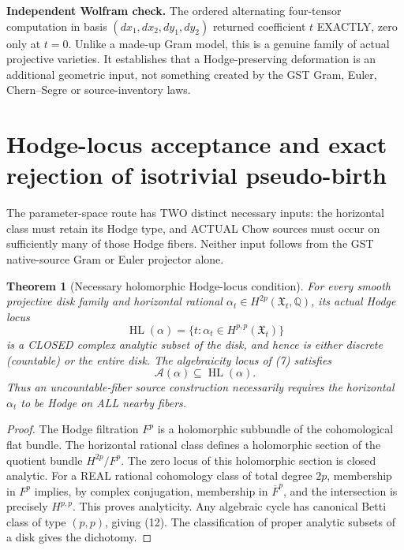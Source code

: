 \documentclass[11pt]{article}
\newcommand{\Q}{\mathbb Q}
\newtheorem{theorem}{Theorem}
\begin{document}
\noindent\textbf{Independent Wolfram check.}
The ordered alternating four-tensor computation in
basis \((dx_1,dx_2,dy_1,dy_2)\)
returned coefficient \(t\) EXACTLY,
zero only at \(t=0\).
Unlike a made-up Gram model, this is
a genuine family of actual projective varieties.
It establishes that a Hodge-preserving deformation
is an additional geometric input, not something
created by the GST Gram, Euler, Chern--Segre or
source-inventory laws.

\section{Hodge-locus acceptance and exact rejection of isotrivial pseudo-birth}
The parameter-space
route has TWO
distinct
necessary inputs:
the horizontal
class must retain
its Hodge type,
and ACTUAL
Chow sources
must occur
on sufficiently
many of those
Hodge fibers.
Neither input
follows from
the GST
native-source
Gram or Euler
projector alone.

\begin{theorem}[Necessary holomorphic Hodge-locus condition]
For every
smooth projective
disk family
and horizontal
rational
\(\alpha_t\in
H^{2p}(\mathfrak X_t,\Q)\),
its actual
Hodge locus
\[
 \operatorname{HL}(\alpha)
 =\{t:\alpha_t
        \in H^{p,p}(\mathfrak X_t)\}
\]
is a CLOSED
complex analytic
subset of
the disk,
and hence
is either
discrete
(countable)
or the
entire disk.
The algebraicity
locus of (7)
satisfies
\[
 \boxed{
 \mathscr A(\alpha)
           \subseteq\operatorname{HL}(\alpha).}
                                                               \tag{12}
\]
Thus an
uncountable-fiber
source construction
necessarily
requires
the horizontal
\(\alpha_t\)
to be Hodge
on ALL
nearby fibers.
\end{theorem}
\begin{proof}
The Hodge
filtration
\(F^p\)
is a holomorphic
subbundle
of the
cohomological
flat bundle.
The horizontal
rational class
defines a
holomorphic
section of
the quotient
bundle
\(H^{2p}/F^p\).
The zero locus
of this
holomorphic
section is
closed analytic.
For a REAL
rational
cohomology class
of total degree
\(2p\),
membership
in \(F^p\)
implies, by
complex conjugation,
membership
in \(\overline F^p\),
and the
intersection
is precisely
\(H^{p,p}\).
This proves
analyticity.
Any algebraic
cycle has
canonical
Betti class
of type
\((p,p)\),
giving (12).
The
classification
of proper
analytic
subsets of
a disk gives
the dichotomy.
\end{proof}
\end{document}
